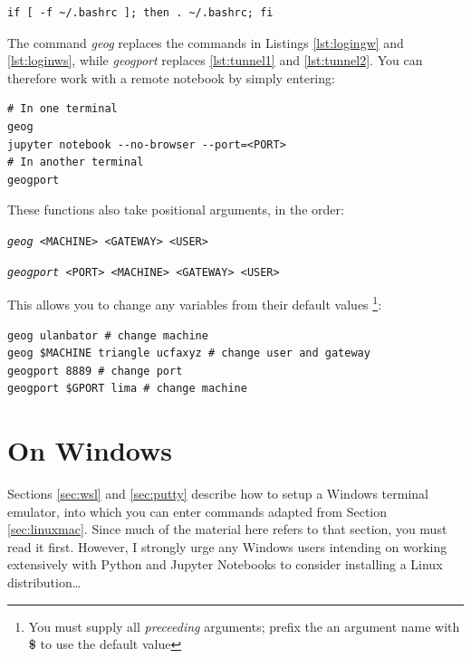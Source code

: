 \documentclass[a4paper]{article}
\begin{document}
\begin{lstlisting}[caption={Source .bashrc on startup}, label={lst:srcbashrc}]
if [ -f ~/.bashrc ]; then . ~/.bashrc; fi
\end{lstlisting}

The command \emph{geog} replaces the commands in Listings \ref{lst:logingw} and \ref{lst:loginws}, while \emph{geogport} replaces \ref{lst:tunnel1} and \ref{lst:tunnel2}.
You can therefore work with a remote notebook by simply entering:
\begin{lstlisting}[caption={Set up and tunnel to remote Notebook server}, label={lst:usegfuncs}]
# In one terminal
geog
jupyter notebook --no-browser --port=<PORT>
# In another terminal
geogport
\end{lstlisting}

These functions also take positional arguments, in the order:

\texttt{\emph{geog} \textless{}MACHINE\textgreater{} \textless{}GATEWAY\textgreater{} \textless{}USER\textgreater{}}
{}

\texttt{\emph{geogport} \textless{}PORT\textgreater{} \textless{}MACHINE\textgreater{} \textless{}GATEWAY\textgreater{} \textless{}USER\textgreater{}}

This allows you to change any variables from their default values \footnote{You must supply all \emph{preceeding} arguments; prefix the an argument name with \textbf{\$} to use the default value}:

\begin{lstlisting}[caption={Examples of arguments to geography login/tunnel functions}, label={lst:gfuncsargseg}]
geog ulanbator # change machine
geog $MACHINE triangle ucfaxyz # change user and gateway
geogport 8889 # change port
geogport $GPORT lima # change machine
\end{lstlisting}

\section{On Windows}
\label{sec:windows}

Sections \ref{sec:wsl} and \ref{sec:putty} describe how to setup a Windows terminal emulator, into which you can enter commands adapted from Section \ref{sec:linuxmac}.
Since much of the material here refers to that section, you must read it first.
However, I strongly urge any Windows users intending on working extensively with Python and Jupyter Notebooks to consider installing a Linux distribution\ldots
\end{document}
